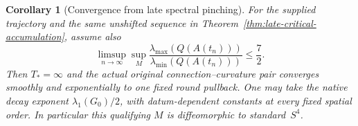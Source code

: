 \documentclass[11pt]{article}
\numberwithin{equation}{section}
\newtheorem{corollary}[theorem]{Corollary}
\theoremstyle{definition}
\theoremstyle{remark}
\begin{document}
\begin{corollary}[Convergence from late spectral pinching]
\label{cor:late-spectral-convergence}
For the supplied trajectory and the same unshifted sequence
in Theorem~\ref{thm:late-critical-accumulation}, assume also
\begin{equation}\label{eq:late-spectral-hypothesis}
 \limsup_{n\to\infty}\sup_M
 \frac{\lambda_{\max}(Q(A(t_n)))}
      {\lambda_{\min}(Q(A(t_n)))}\le\frac72.
\end{equation}
Then $T_*=\infty$ and the actual original connection--curvature
pair converges smoothly and exponentially to one fixed round
pullback. One may take the native decay exponent $\lambda_1(G_0)/2$,
with datum-dependent constants at every fixed spatial order.
In particular this qualifying $M$ is diffeomorphic to standard~$S^4$.
\end{corollary}
\end{document}
